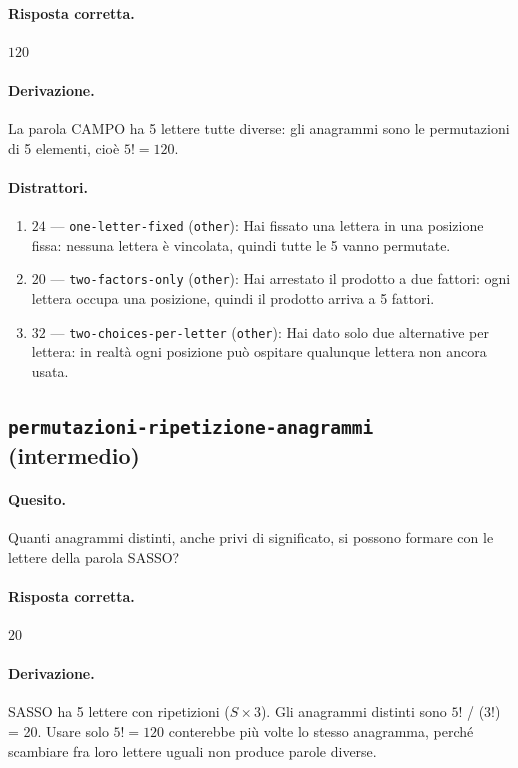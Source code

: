 \paragraph{Risposta corretta.} $120$

\paragraph{Derivazione.} La parola CAMPO ha 5 lettere tutte diverse: gli anagrammi sono le permutazioni di 5 elementi, cioè $5! = 120$.

\paragraph{Distrattori.}
\begin{enumerate}
  \item $24$ --- \texttt{one-letter-fixed} (\texttt{other}): Hai fissato una lettera in una posizione fissa: nessuna lettera è vincolata, quindi tutte le 5 vanno permutate.
  \item $20$ --- \texttt{two-factors-only} (\texttt{other}): Hai arrestato il prodotto a due fattori: ogni lettera occupa una posizione, quindi il prodotto arriva a 5 fattori.
  \item $32$ --- \texttt{two-choices-per-letter} (\texttt{other}): Hai dato solo due alternative per lettera: in realtà ogni posizione può ospitare qualunque lettera non ancora usata.
\end{enumerate}

\subsection{\texorpdfstring{\texttt{permutazioni-ripetizione-anagrammi} (intermedio)}{permutazioni-ripetizione-anagrammi (intermedio)}}

\paragraph{Quesito.} Quanti anagrammi distinti, anche privi di significato, si possono formare con le lettere della parola SASSO?

\paragraph{Risposta corretta.} $20$

\paragraph{Derivazione.} SASSO ha 5 lettere con ripetizioni ($S\times 3$). Gli anagrammi distinti sono $5!$ / ($3!$) = 20. Usare solo $5! = 120$ conterebbe più volte lo stesso anagramma, perché scambiare fra loro lettere uguali non produce parole diverse.


